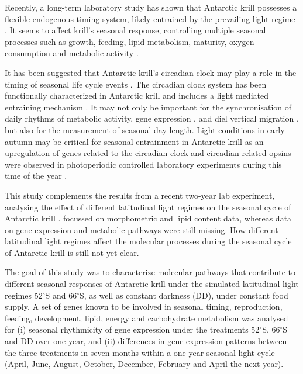 Recently, a long-term laboratory study has shown that Antarctic krill possesses
a flexible endogenous timing system, likely entrained by the prevailing light
regime \citep{horing_light_2018}. It seems to affect krill's seasonal response,
controlling multiple seasonal processes such as growth, feeding, lipid
metabolism, maturity, oxygen consumption and metabolic activity
\citep{horing_light_2018, piccolin_seasonal_2018}.

It has been suggested that Antarctic krill's circadian clock may play a role in
the timing of seasonal life cycle events \citep{piccolin_seasonal_2018}. The
circadian clock system has been functionally characterized in Antarctic krill
and includes a light mediated entraining mechanism
\citep{biscontin_functional_2017}. It may not only be important for the
synchronisation of daily rhythms of metabolic activity, gene expression
\citep{de_pitta_antarctic_2013, teschke_circadian_2011}, and diel vertical
migration \citep{gaten_is_2008}, but also for the measurement of seasonal day
length. Light conditions in early autumn may be critical for seasonal
entrainment in Antarctic krill as an upregulation of genes related to the
circadian clock and circadian-related opsins were observed in photoperiodic
controlled laboratory experiments during this time of the year
\citep{piccolin_seasonal_2018}.

This study complements the results from a recent two-year lab experiment,
analysing the effect of different latitudinal light regimes on the seasonal
cycle of Antarctic krill \citep{horing_light_2018}. \citet{horing_light_2018}
focussed on morphometric and lipid content data, whereas data on gene
expression and metabolic pathways were still missing. How different latitudinal
light regimes affect the molecular processes during the seasonal cycle of
Antarctic krill is still not yet clear.

The goal of this study was to characterize molecular pathways that contribute
to different seasonal responses of Antarctic krill under the simulated
latitudinal light regimes 52$^{\circ}$S and 66$^{\circ}$S, as well as constant
darkness (DD), under constant food supply. A set of genes known to be involved
in seasonal timing, reproduction, feeding, development, lipid, energy and
carbohydrate metabolism was analysed for (i) seasonal rhythmicity of gene
expression under the treatments 52$^{\circ}$S, 66$^{\circ}$S and DD over one
year, and (ii) differences in gene expression patterns between the three
treatments in seven months within a one year seasonal light cycle (April, June,
August, October, December, February and April the next year).



